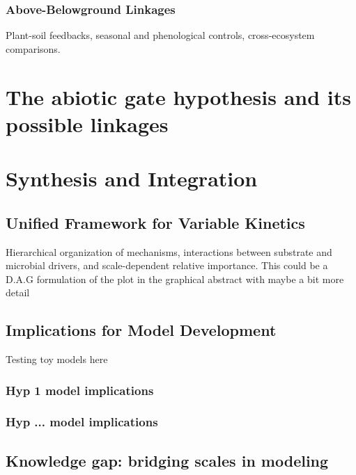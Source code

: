 \documentclass[12pt,a4paper]{article}
\begin{document}
\subsubsection{Above-Belowground Linkages} \label{sec:microbial_linkages}

Plant-soil feedbacks, seasonal and phenological controls, cross-ecosystem comparisons.


\section{The abiotic gate hypothesis and its possible linkages}


\section{Synthesis and Integration} \label{sec:synthesis}

\subsection{Unified Framework for Variable Kinetics} \label{sec:synthesis_framework}

Hierarchical organization of mechanisms, interactions between substrate and microbial drivers, and scale-dependent relative importance.
This could be a D.A.G formulation of the plot in the graphical abstract with maybe a bit more detail


\subsection{Implications for Model Development} \label{sec:synthesis_models}

Testing toy models here

\subsubsection{ Hyp 1 model implications}

\subsubsection{ Hyp ... model implications}


\subsection{Knowledge gap: bridging scales in modeling} \label{sec:synthesis_scales}
\end{document}
